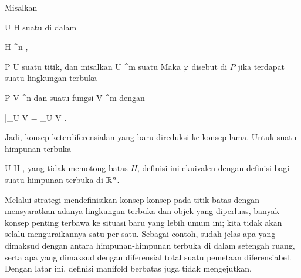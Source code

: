 {}
{

Misalkan

\mavergleichskette
{\vergleichskette
{ U
}
{ \subseteq }{ H
}
{  }{
}
{    }{
}
{   }{
}
}
{}{}{}
suatu
di dalam

\mavergleichskette
{\vergleichskette
{ H
}
{ \subseteq }{ \R^n
}
{  }{
}
{    }{
}
{   }{
}
}
{}{}{,}

\mavergleichskette
{\vergleichskette
{ P
}
{ \in }{ U
}
{  }{
}
{    }{
}
{   }{
}
}
{}{}{}
suatu titik, dan misalkan
\maabbdisp {\varphi} { U } {\R^m
} {}
suatu
Maka $\varphi$ disebut  di $P$ jika terdapat suatu lingkungan terbuka

\mavergleichskette
{\vergleichskette
{ P
}
{ \in }{ V
}
{ \subseteq }{ \R^n
}
{    }{
}
{   }{
}
}
{}{}{}
dan suatu fungsi
\maabbdisp {\tilde{\varphi}} { V } {\R^m
} {}
dengan

\mavergleichskette
{\vergleichskette
{ \tilde{\varphi} {{|}}_{U \cap V}
}
{ = }{\varphi {{|}}_{U \cap V}
}
{  }{
}
{    }{
}
{   }{
}
}
{}{}{.}

}
Jadi, konsep keterdiferensialan yang baru direduksi ke konsep lama. Untuk suatu himpunan terbuka

\mavergleichskette
{\vergleichskette
{ U
}
{ \subseteq }{ H
}
{  }{
}
{    }{
}
{   }{
}
}
{}{}{,}
yang tidak memotong batas $H$, definisi ini ekuivalen dengan definisi bagi suatu himpunan terbuka di ${\mathbb R}^n$.

Melalui strategi mendefinisikan konsep-konsep pada titik batas dengan mensyaratkan adanya lingkungan terbuka dan objek yang diperluas, banyak konsep penting terbawa ke situasi baru yang lebih umum ini; kita tidak akan selalu menguraikannya satu per satu. Sebagai contoh, sudah jelas apa yang dimaksud dengan  {} antara himpunan-himpunan terbuka di dalam setengah ruang, serta apa yang dimaksud dengan diferensial total suatu pemetaan diferensiabel. Dengan latar ini, definisi manifold berbatas juga tidak mengejutkan.
